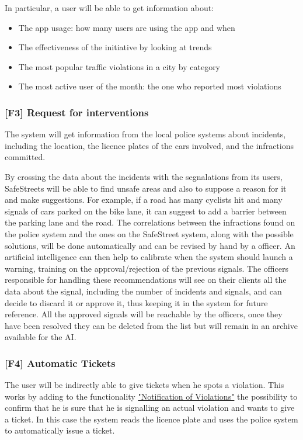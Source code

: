 In particular, a user will be able to get information about:
\begin{itemize}
    \item The app usage: how many users are using the app and when
    \item The effectiveness of the initiative by looking at trends
    \item The most popular traffic violations in a city by category
    \item The most active user of the month: the one who reported most violations
\end{itemize}
\subsubsection[Request for interventions]{[F3] Request for interventions\hypertarget{sec:f3}{}}
\label{sec:request_for_interventions}
The system will get information from the local police systems about incidents, including the location, the licence plates of the cars involved, and the infractions committed.

By crossing the data about the incidents with the segnalations from its users, SafeStreets will be able to find unsafe areas and also to suppose a reason for it and make suggestions.
For example, if a road has many cyclists hit and many signals of cars parked on the bike lane, it can suggest to add a barrier between the parking lane and the road.
The correlations between the infractions found on the police system and the ones on the SafeStreet system, along with the possible solutions, will be done automatically and can be revised by hand by a officer.
An artificial intelligence can then help to calibrate when the system should launch a warning, training on the approval/rejection of the previous signals.
\clearpage
The officers responsible for handling these recommendations will see on their clients all the data about the signal,
including the number of incidents and signals, and can decide to discard it or approve it, thus keeping it in the system for future reference.
All the approved signals will be reachable by the officers, once they have been resolved they can be deleted from the list but will remain in an archive available for the AI.


\subsubsection[Automatic Tickets]{[F4] Automatic Tickets\hypertarget{sec:f4}{}}
\label{sec:automatic_tickets}
The user will be indirectly able to give tickets when he spots a violation. This works by adding to the functionality
\hyperref[sec:notification_of_violations]{"Notification of Violations"}
the possibility to confirm that he is sure that he is signalling an actual violation and wants to give a ticket.
In this case the system reads the licence plate and uses the police system to automatically issue a ticket.

